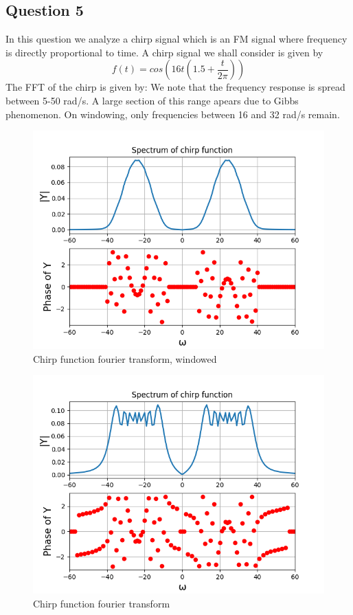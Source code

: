 \documentclass{article}
\begin{document}
\subsection{Question 5}
In this question we analyze a chirp signal which is an FM signal where frequency is directly proportional to time.
A chirp signal we shall consider is given by 
\begin{equation}
    f(t) = cos(16t(1.5 + \frac{t}{2\pi}))
\end{equation}
The FFT of the chirp is given by:
We note that the frequency response is spread between 5-50 rad/s. A large section of this range apears due to Gibbs phenomenon. On windowing, only frequencies between 16 and 32 rad/s remain.
\begin{figure}[h!]
\centering
\includegraphics[scale=0.6]{q5(a).png}
\caption{Chirp function fourier transform, windowed}
\label{fig:universe}
\end{figure}
\begin{figure}[h!]
\centering
\includegraphics[scale=0.6]{q5(b).png}
\caption{Chirp function fourier transform}
\label{fig:universe}
\end{figure}
\end{document}

